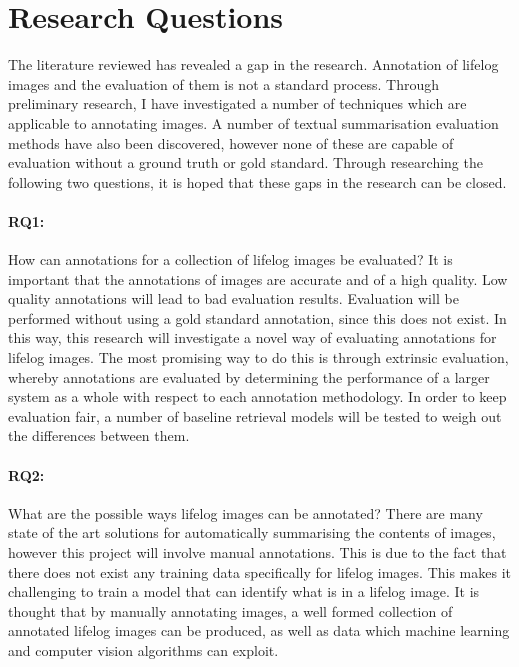 \documentclass[12pt,a4paper]{article}
\begin{document}

\section{Research Questions}
The literature reviewed has revealed a gap in the research. Annotation of lifelog images and the evaluation of them is not a standard process. Through preliminary research, I have investigated a number of techniques which are applicable to annotating images. A number of textual summarisation evaluation methods have also been discovered, however none of these are capable of evaluation without a ground truth or gold standard. Through researching the following two questions, it is hoped that these gaps in the research can be closed.

\paragraph{RQ1:} How can annotations for a collection of lifelog images be evaluated?
It is important that the annotations of images are accurate and of a high quality. Low quality annotations will lead to bad evaluation results. Evaluation will be performed without using a gold standard annotation, since this does not exist. In this way, this research will investigate a novel way of evaluating annotations for lifelog images. The most promising way to do this is through extrinsic evaluation, whereby annotations are evaluated by determining the performance of a larger system as a whole with respect to each annotation methodology. In order to keep evaluation fair, a number of baseline retrieval models will be tested to weigh out the differences between them.

\paragraph{RQ2:} What are the possible ways lifelog images can be annotated?
There are many state of the art solutions for automatically summarising the contents of images, however this project will involve manual annotations. This is due to the fact that there does not exist any training data specifically for lifelog images. This makes it challenging to train a model that can identify what is in a lifelog image. It is thought that by manually annotating images, a well formed collection of annotated lifelog images can be produced, as well as data which machine learning and computer vision algorithms can exploit.
\end{document}
